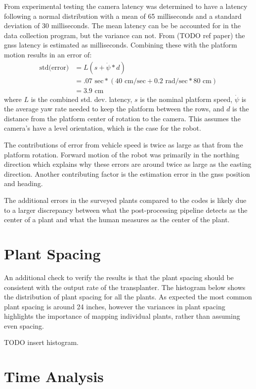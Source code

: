 From experimental testing the camera latency was determined to have a latency following a normal distribution with a mean of 65 milliseconds and a standard deviation of 30 milliseconds.  The mean latency can be be accounted for in the data collection program, but the variance can not. From (TODO ref paper) the \ac{gnss} latency is estimated as {} milliseconds. Combining these with the platform motion results in an error of:
\begin{align*}
 \text{std(error)} &= L (s + \dot{\psi}*d) \\
             &= .07 \text{ sec}* (40\text{ cm/sec} + 0.2 \text{ rad/sec} * 80 \text{ cm}) \\ 
             &= 3.9 \text{ cm}
\end{align*}
where $L$ is the combined std. dev. latency, $s$ is the nominal platform speed, $\dot{\psi}$ is the average yaw rate needed to keep the platform between the rows, and $d$ is the distance from the platform center of rotation to the camera.  This assumes the camera's have a level orientation, which is the case for the robot.

The contributions of error from vehicle speed is twice as large as that from the platform rotation. Forward motion of the robot was primarily in the northing direction which explains why these errors are around twice as large as the easting direction.  Another contributing factor is the estimation error in the \ac{gnss} position and heading.

The additional errors in the surveyed plants compared to the codes is likely due to a larger discrepancy between what the post-processing pipeline detects as the center of a plant and what the human measures as the center of the plant. 

\section{Plant Spacing}

An additional check to verify the results is that the plant spacing should be consistent with the output rate of the transplanter.  The histogram below shows the distribution of plant spacing for all the plants.  As expected the most common plant spacing is around 24 inches, however the variances in plant spacing highlights the importance of mapping individual plants, rather than assuming even spacing.

TODO insert histogram.

\section{Time Analysis}

